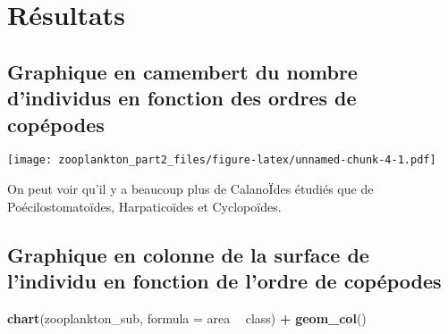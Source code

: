 \documentclass[]{article}
\newenvironment{Shaded}{\begin{snugshade}}{\end{snugshade}}
\newcommand{\KeywordTok}[1]{\textcolor[rgb]{0.13,0.29,0.53}{\textbf{#1}}}
\newcommand{\DataTypeTok}[1]{\textcolor[rgb]{0.13,0.29,0.53}{#1}}
\newcommand{\DecValTok}[1]{\textcolor[rgb]{0.00,0.00,0.81}{#1}}
\newcommand{\StringTok}[1]{\textcolor[rgb]{0.31,0.60,0.02}{#1}}
\newcommand{\OperatorTok}[1]{\textcolor[rgb]{0.81,0.36,0.00}{\textbf{#1}}}
\newcommand{\NormalTok}[1]{#1}
\begin{document}
\section{Résultats}\label{resultats}

\subsection{Graphique en camembert du nombre d'individus en fonction des
ordres de
copépodes}\label{graphique-en-camembert-du-nombre-dindividus-en-fonction-des-ordres-de-copepodes}

\begin{Shaded}
\end{Shaded}

\texttt{[image: zooplankton\_part2\_files/figure-latex/unnamed-chunk-4-1.pdf]}

On peut voir qu'il y a beaucoup plus de CalanoÏdes étudiés que de
Poécilostomatoïdes, Harpaticoïdes et Cyclopoïdes.

\subsection{Graphique en colonne de la surface de l'individu en fonction
de l'ordre de
copépodes}\label{graphique-en-colonne-de-la-surface-de-lindividu-en-fonction-de-lordre-de-copepodes}

\begin{Shaded}
\begin{Highlighting}[]
\KeywordTok{chart}\NormalTok{(zooplankton_sub, }\DataTypeTok{formula =}\NormalTok{ area }\OperatorTok{~}\StringTok{ }\NormalTok{class) }\OperatorTok{+}
\StringTok{  }\KeywordTok{geom_col}\NormalTok{() }
\end{Highlighting}
\end{Shaded}
\end{document}
